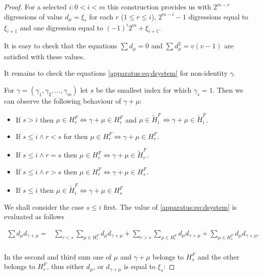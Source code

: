 \begin{proof}
	For a selected $i \colon 0 < i < m$ this construction provides us with $2^{m-r}$ digressions of value $d_\mu=\xi_r$ for each $r$ ($1 \leq r\leq i$), $2^{m-i}-1$ digressions equal to $\xi_{i+1}$ and one digression equal to $(-1)^i 2^m+\xi_{i+1}$.
    
    It is easy to check that the equations $\sum d_\mu = 0$ and $\sum d_\mu^2 = v(v-1)$ are satisfied with these values.
    
    It remains to check the equations \eqref{apparatus:eq:dsystem} for non-identity $\gamma$.
    
    For $\gamma = (\gamma_1, \gamma_2, \ldots, \gamma_m)$ let $s$ be the smallest index for which $\gamma_s=1$. Then we can observe the following behaviour of $\gamma + \mu$:
    \begin{itemize}
        \item If $s > i$ then $\mu \in H_r^F \iff  \gamma + \mu \in H_r^F$ and $\mu \in \widetilde H_i^F \iff  \gamma + \mu \in \widetilde H_i^F$.
        \item If $s \leq i \land r < s$ for then $\mu \in H_r^F \iff  \gamma + \mu \in H_r^F$.
        \item If $s \leq i \land r = s$ then $\mu \in H_r^F \iff  \gamma + \mu \in \widetilde H_r^F$.
        \item If $s \leq i \land r > s$ then $\mu \in H_r^F \iff  \gamma + \mu \in H_s^F$.
        \item If $s \leq i$ then $\mu \in \widetilde H_i^F \iff \gamma + \mu \in H_s^F$
    \end{itemize}
    
    We shall consider the case $s\leq i$ first. The value of \eqref{apparatus:eq:dsystem} is evaluated as follows
    
    \begin{equation}
        \begin{split}
            \sum d_\mu d_{\gamma+\mu}
              = & \sum\limits_{r<s} \sum\limits_{\mu \in H_r^F} d_\mu d_{\gamma + \mu}
                + \sum\limits_{r>s} \sum\limits_{\mu \in H_r^F} d_\mu d_{\gamma + \mu}
                + \sum\limits_{\mu \in H_s^F} d_\mu d_{\gamma + \mu}. \\
        \end{split}
    \end{equation}
    
    In the second and third sum one of $\mu$ and $\gamma + \mu$ belongs to $H_s^F$ and the other belongs to $H_r^F$,
thus either $d_\mu$, or $d_{\gamma+\mu}$ is equal to $\xi_s$:
    

\end{proof}

